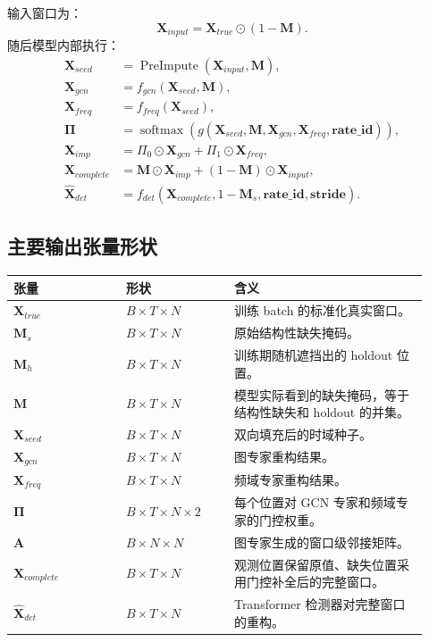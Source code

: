 \documentclass[UTF8]{ctexart}
\begin{document}
输入窗口为：
\begin{equation}
    \bm{X}_{input} =
    \bm{X}_{true}\odot(1-\bm{M}).
\end{equation}
随后模型内部执行：
\begin{align}
    \bm{X}_{seed} &= \operatorname{PreImpute}(\bm{X}_{input},\bm{M}), \\
    \bm{X}_{gcn} &= f_{gcn}(\bm{X}_{seed},\bm{M}), \\
    \bm{X}_{freq} &= f_{freq}(\bm{X}_{seed}), \\
    \bm{\Pi} &= \operatorname{softmax}(g(\bm{X}_{seed},\bm{M},\bm{X}_{gcn},\bm{X}_{freq},\bm{rate\_id})), \\
    \bm{X}_{imp} &= \Pi_{0}\odot\bm{X}_{gcn}+\Pi_{1}\odot\bm{X}_{freq}, \\
    \bm{X}_{complete} &= \bm{M}\odot\bm{X}_{imp}+(1-\bm{M})\odot\bm{X}_{input}, \\
    \widehat{\bm{X}}_{det} &= f_{det}(\bm{X}_{complete},1-\bm{M}_s,\bm{rate\_id},\bm{stride}).
\end{align}

\subsection{主要输出张量形状}

{\small
\begin{longtable}{@{}>{\raggedright\arraybackslash}p{0.25\linewidth} >{\raggedright\arraybackslash}p{0.24\linewidth} >{\raggedright\arraybackslash}p{0.43\linewidth}@{}}
\toprule
张量 & 形状 & 含义 \\
\midrule
\endhead
\(\bm{X}_{true}\) & \(B\times T\times N\) & 训练 batch 的标准化真实窗口。 \\
\(\bm{M}_s\) & \(B\times T\times N\) & 原始结构性缺失掩码。 \\
\(\bm{M}_h\) & \(B\times T\times N\) & 训练期随机遮挡出的 holdout 位置。 \\
\(\bm{M}\) & \(B\times T\times N\) & 模型实际看到的缺失掩码，等于结构性缺失和 holdout 的并集。 \\
\(\bm{X}_{seed}\) & \(B\times T\times N\) & 双向填充后的时域种子。 \\
\(\bm{X}_{gcn}\) & \(B\times T\times N\) & 图专家重构结果。 \\
\(\bm{X}_{freq}\) & \(B\times T\times N\) & 频域专家重构结果。 \\
\(\bm{\Pi}\) & \(B\times T\times N\times2\) & 每个位置对 GCN 专家和频域专家的门控权重。 \\
\(\bm{A}\) & \(B\times N\times N\) & 图专家生成的窗口级邻接矩阵。 \\
\(\bm{X}_{complete}\) & \(B\times T\times N\) & 观测位置保留原值、缺失位置采用门控补全后的完整窗口。 \\
\(\widehat{\bm{X}}_{det}\) & \(B\times T\times N\) & Transformer 检测器对完整窗口的重构。 \\
\bottomrule
\end{longtable}
}
\end{document}
